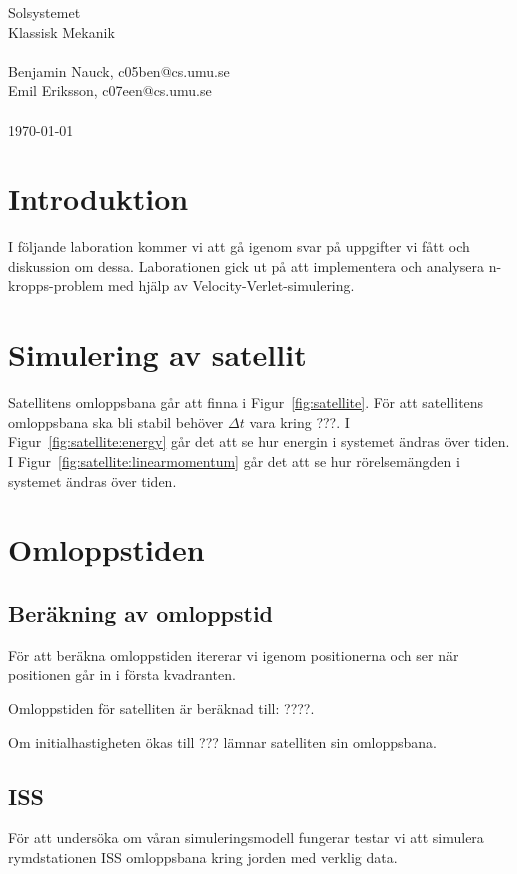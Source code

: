 \documentclass[a4]{article}
\begin{document}
{
\Large
Solsystemet\\
Klassisk Mekanik\\
~\\
Benjamin Nauck, c05ben@cs.umu.se\\
Emil Eriksson, c07een@cs.umu.se\\
~\\
\today{}
}
\clearpage

\section{Introduktion}
I följande laboration kommer vi att gå igenom svar på uppgifter vi fått och
diskussion om dessa.
Laborationen gick ut på att implementera och analysera n-kropps-problem med
hjälp av Velocity-Verlet-simulering.

\section{Simulering av satellit}
Satellitens omloppsbana går att finna i Figur~\vref{fig:satellite}.
För att satellitens omloppsbana ska bli stabil behöver $\Delta t$ vara kring
???.
I Figur~\vref{fig:satellite:energy} går det att se hur energin i systemet ändras
över tiden.
I Figur~\vref{fig:satellite:linearmomentum} går det att se hur rörelsemängden i
systemet ändras över tiden.


\section{Omloppstiden}
	\subsection{Beräkning av omloppstid}
För att beräkna omloppstiden itererar vi igenom positionerna och ser när
positionen går in i första kvadranten.

Omloppstiden för satelliten är beräknad till: ????.

Om initialhastigheten ökas till ??? lämnar satelliten sin omloppsbana.

	\subsection{ISS}
För att undersöka om våran simuleringsmodell fungerar testar vi att simulera
rymdstationen ISS omloppsbana kring jorden med verklig data.
\end{document}
